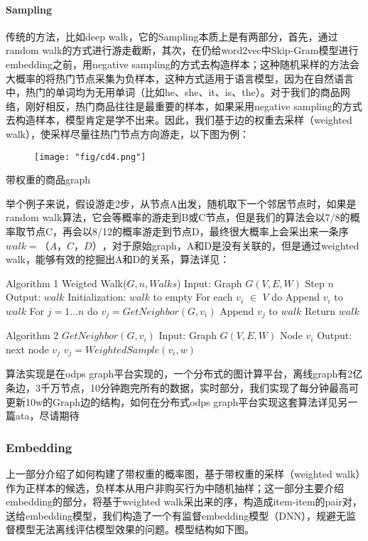 \paragraph{Sampling}
传统的方法，比如deep walk，它的Sampling本质上是有两部分，首先，通过random walk的方式进行游走截断，其次，在仍给word2vec中Skip-Gram模型进行embedding之前，用negative sampling的方式去构造样本；这种随机采样的方法会大概率的将热门节点采集为负样本，这种方式适用于语言模型，因为在自然语言中，热门的单词均为无用单词（比如he、she、it、is、the）。对于我们的商品网络，刚好相反，热门商品往往是最重要的样本，如果采用negative sampling的方式去构造样本，模型肯定是学不出来。因此，我们基于边的权重去采样（weighted walk），使采样尽量往热门节点方向游走，以下图为例：

\begin{figure}[!h]
	\centering
	\texttt{[image: "fig/cd4.png"]}
	\caption{}
	\label{fig:cd4}
\end{figure}

\par 带权重的商品graph
\par 举个例子来说，假设游走2步，从节点A出发，随机取下一个邻居节点时，如果是random walk算法，它会等概率的游走到B或C节点，但是我们的算法会以7/8的概率取节点C，再会以8/12的概率游走到节点D，最终很大概率上会采出来一条序$walk=（A，C，D）$，对于原始graph，A和D是没有关联的，但是通过weighted walk，能够有效的挖掘出A和D的关系，算法详见：

Algorithm 1 Weigted Walk($G,n,Walks$)
Input: Graph $G(V,E,W)$
\quad\quad\quad Step $n$
Output: $walk$
Initialization: $walk$ to empty
\quad\quad For each $v_i$ $\in$ $V$ do
\quad\quad\quad Append $v_i$ to $walk$
\quad\quad\quad For $j=1...n$ do
\quad\quad\quad\quad\quad $v_j=GetNeighbor(G,v_i)$
\quad\quad\quad\quad\quad Append $v_j$ to $walk$
\quad\quad\quad Return $walk$

Algorithm 2 $GetNeighbor(G,v_i)$
Input: Graph $G(V,E,W)$
\quad\quad\quad Node $v_i$
Output: next node $v_j$
$v_j=WeightedSample(v_i,w)$

算法实现是在odps graph平台实现的，一个分布式的图计算平台，离线graph有2亿条边，3千万节点，10分钟跑完所有的数据，实时部分，我们实现了每分钟最高可更新10w的Graph边的结构，如何在分布式odps graph平台实现这套算法详见另一篇ata，尽请期待

\subsubsection{Embedding}
上一部分介绍了如何构建了带权重的概率图，基于带权重的采样（weighted walk）作为正样本的候选，负样本从用户非购买行为中随机抽样；这一部分主要介绍embedding的部分，将基于weighted walk采出来的序，构造成item-item的pair对，送给embedding模型，我们构造了一个有监督embedding模型（DNN），规避无监督模型无法离线评估模型效果的问题。模型结构如下图。

